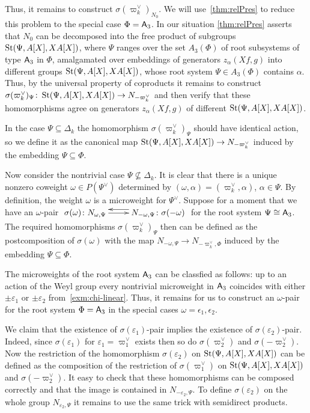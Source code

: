 Thus, it remains to construct $\sigma({\varpi_k^\vee})_{N_0}$.
We will use~\cref{thm:relPres} to reduce this problem to the special case $\Phi = \mathsf{A}_3$.
In our situation \cref{thm:relPres} asserts that $N_0$ can be decomposed into the free product of subgroups $\operatorname{St}(\Psi, A[X], XA[X])$,
 where $\Psi$ ranges over the set $A_3(\Phi)$ of root subsystems of type $\mathsf{A}_3$ in $\Phi$, amalgamated over embeddings of generators $z_\alpha(Xf, g)$ into different groups $\operatorname{St}(\Psi, A[X], XA[X])$, whose root system $\Psi \in A_3(\Phi)$ contains $\alpha$.
Thus, by the universal property of coproducts it remains to construct $\sigma(\varpi_k^\vee)_\Psi \colon \operatorname{St}(\Psi, A[X], XA[X]) \to N_{-\varpi_k^\vee}$ and then
  verify that these homomorphisms agree on generators $z_\alpha(Xf, g)$ of different $\operatorname{St}(\Psi, A[X], XA[X])$.

In the case $\Psi \subseteq \Delta_k$ the homomorphism $\sigma(\varpi_k^\vee)_\Psi$ should have identical action, so we define it as the canonical map $\operatorname{St}(\Psi, A[X], XA[X]) \to N_{-\varpi_k^\vee}$
induced by the embedding $\Psi \subseteq \Phi$.

Now consider the nontrivial case $\Psi \not\subseteq \Delta_k$.
It is clear that there is a unique nonzero coweight $\omega \in P(\Psi^\vee)$ determined by $(\omega, \alpha) = (\varpi_k^\vee, \alpha)$, $\alpha \in \Psi$.
By definition, the weight $\omega$ is a microweight for $\Psi^\vee$.
Suppose for a moment that we have an $\omega$-pair $\xymatrix{ \sigma(\omega)\colon N_{\omega, \Psi} \ar[r] & \ar@<-1.0ex>[l] N_{-\omega, \Psi}\colon \sigma(-\omega) }$ for the root system $\Psi\cong \mathsf{A}_3$.
The required homomorphisms $\sigma(\varpi_k^\vee)_\Psi$ then can be defined as the postcomposition of $\sigma(\omega)$ with the map $N_{-\omega, \Psi} \to N_{-\varpi_k^\vee, \Phi}$ induced by the embedding $\Psi \subseteq \Phi$.

The microweights of the root system $\mathsf{A}_3$ can be classfied as follows: up to an action of the Weyl group every nontrivial microweight in $\mathsf{A}_3$ coincides with either $\pm\varepsilon_1$ or $\pm\varepsilon_2$ from~\cref{exm:chi-linear}.
Thus, it remains for us to construct an $\omega$-pair for the root system $\Phi=\mathsf{A}_3$ in the special cases $\omega = \epsilon_1, \epsilon_2$.

We claim that the existence of $\sigma(\varepsilon_1)$-pair implies the existence of $\sigma(\varepsilon_2)$-pair.
Indeed, since $\sigma(\varepsilon_1)$ for $\varepsilon_1 = \varpi_1^\vee$ exists then so do $\sigma(\varpi_2^\vee)$ and $\sigma(-\varpi_2^\vee)$.
Now the restriction of the homomorphism $\sigma(\varepsilon_2)$ on $\operatorname{St}(\Psi, A[X], XA[X])$ can be defined as the composition of the restriction of $\sigma(\varpi_1^\vee)$ on $\operatorname{St}(\Psi, A[X], XA[X])$ and $\sigma(-\varpi_2^\vee)$.
It easy to check that these homomorphisms can be composed correctly and that the image is contained in $N_{-\varepsilon_2, \Psi}$.
To define $\sigma(\varepsilon_2)$ on the whole group $N_{\varepsilon_2, \Psi}$ it remains to use the same trick with semidirect products.

